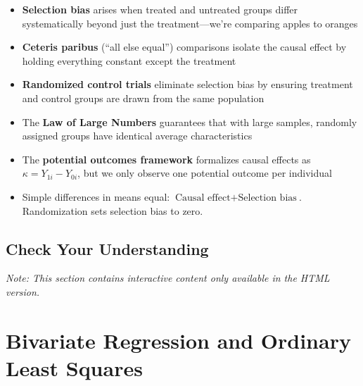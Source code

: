 \documentclass[
  letterpaper,
  DIV=11,
  numbers=noendperiod]{scrreprt}
\begin{document}
\begin{itemize}
\item
  \textbf{Selection bias} arises when treated and untreated groups
  differ systematically beyond just the treatment---we're comparing
  apples to oranges
\item
  \textbf{Ceteris paribus} (``all else equal'') comparisons isolate the
  causal effect by holding everything constant except the treatment
\item
  \textbf{Randomized control trials} eliminate selection bias by
  ensuring treatment and control groups are drawn from the same
  population
\item
  The \textbf{Law of Large Numbers} guarantees that with large samples,
  randomly assigned groups have identical average characteristics
\item
  The \textbf{potential outcomes framework} formalizes causal effects as
  \(\kappa = Y_{1i} - Y_{0i}\), but we only observe one potential
  outcome per individual
\item
  Simple differences in means equal:
  \(\text{Causal effect} + \text{Selection bias}\). Randomization sets
  selection bias to zero.
\end{itemize}

\section{Check Your Understanding}\label{check-your-understanding-2}

\emph{Note: This section contains interactive content only available in
the HTML version.}


\chapter{Bivariate Regression and Ordinary Least Squares}\label{sec-ols}
\end{document}
